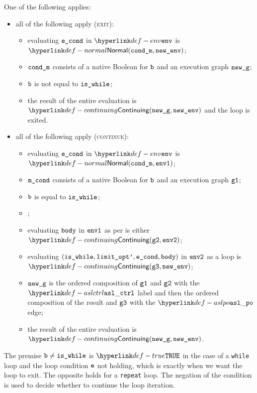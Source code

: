 \ProseParagraph
One of the following applies:
\begin{itemize}
\item all of the following apply (\textsc{exit}):
  \begin{itemize}
    \item evaluating $\texttt{e\_cond}$ in $\env$ is $\Normal(\condm, \newenv)$\ProseOrAbnormal;
    \item $\texttt{cond\_m}$ consists of a native Boolean for $\texttt{b}$ and an execution graph $\texttt{new\_g}$;
    \item $\texttt{b}$ is not equal to $\texttt{is\_while}$;
    \item the result of the entire evaluation is $\Continuing(\newg, \newenv)$
    and the loop is exited.
  \end{itemize}
\item all of the following apply (\textsc{continue}):
  \begin{itemize}
    \item evaluating $\texttt{e\_cond}$ in $\env$ is $\Normal(\condm, \envone)$;
    \item $\texttt{m\_cond}$ consists of a native Boolean for $\texttt{b}$ and an execution graph $\texttt{g1}$;
    \item $\texttt{b}$ is equal to $\texttt{is\_while}$;
    \item \Proseticklooplimit{$\vlimitopt$}{$\vlimitoptp$}\ProseOrError;
    \item evaluating $\texttt{body}$ in $\texttt{env1}$ as per  is either \\
    $\Continuing(\vgtwo, \envtwo)$\ProseTerminateAs{\ReturningConfig, \ThrowingConfig, \DynErrorConfig};
    \item evaluating $(\texttt{is\_while}, \texttt{limit\_opt'}, \texttt{e\_cond}, \texttt{body})$ in $\texttt{env2}$ as a loop is \\
    $\Continuing(\vgthree, \newenv)$\ProseTerminateAs{\ReturningConfig, \ThrowingConfig, \DynErrorConfig};
    \item $\texttt{new\_g}$ is the ordered composition of $\texttt{g1}$ and $\texttt{g2}$ with the $\aslctrl$ label
    and then the ordered composition of the result and $\texttt{g3}$ with the $\aslpo$ edge;
    \item the result of the entire evaluation is $\Continuing(\newg, \newenv)$.
  \end{itemize}
\end{itemize}

\FormallyParagraph
The premise $\texttt{b} \neq \texttt{is\_while}$ is $\True$ in the case of a \texttt{while} loop
and the loop condition $\texttt{e}$ not holding, which is exactly when we want the
loop to exit. The opposite holds for a \texttt{repeat} loop.
The negation of the condition is used to decide whether to continue the loop iteration.

